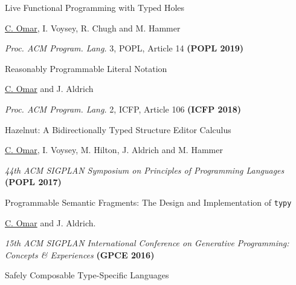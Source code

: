 \documentclass[10pt,letterpaper]{article}
\renewenvironment{itemize}{
  \begin{list}{}{
    \setlength{\leftmargin}{1.25em}
    \setlength{\itemsep}{0.25em}
    \setlength{\parskip}{0pt}
    \setlength{\parsep}{0.2em}
  }
}{
  \end{list}
}
\begin{document}
\begin{enumerate}
\item {Live Functional Programming with Typed Holes}
  \begin{itemize}
    \item \underline{C. Omar}, I. Voysey, R. Chugh and M. Hammer
    \item \textit{Proc. ACM Program. Lang.} 3, POPL, Article 14 \textbf{(POPL 2019)}
  \end{itemize}
\item {Reasonably Programmable Literal Notation}
  \begin{itemize}
    \item \underline{C. Omar} and J. Aldrich
    \item \textit{Proc. ACM Program. Lang.} 2, ICFP, Article 106 \textbf{(ICFP 2018)}
  \end{itemize}
\item {Hazelnut: A Bidirectionally Typed Structure Editor Calculus}
  \begin{itemize}
    \item \underline{C. Omar}, I. Voysey, M. Hilton, J. Aldrich and M. Hammer
    \item \textit{44th ACM SIGPLAN Symposium on Principles of Programming Languages} {\textbf{(POPL 2017)}}
  \end{itemize}
\item {Programmable Semantic Fragments: The Design and Implementation of \texttt{typy}}
  \begin{itemize}
    \item \underline{C. Omar} and J. Aldrich.
    \item \textit{15th ACM SIGPLAN International Conference on Generative Programming: Concepts \& Experiences} {\textbf{(GPCE 2016)}}
  \end{itemize}
\item {Safely Composable Type-Specific Languages}

\end{enumerate}
\end{document}
